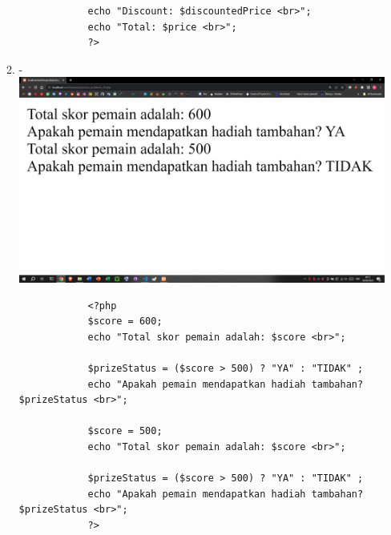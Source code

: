 \documentclass[12pt,titlepage]{article}
\begin{document}
\begin{enumerate}[label*=\arabic*.]
\begin{enumerate}[label*=\arabic*.]
\begin{verbatim}
            echo "Discount: $discountedPrice <br>";
            echo "Total: $price <br>";
            ?>
        \end{verbatim}
        \item - \\ \includegraphics[width=.8\textwidth]{images/figures/fig15.png}
        \begin{verbatim}
            <?php
            $score = 600;
            echo "Total skor pemain adalah: $score <br>";
            
            $prizeStatus = ($score > 500) ? "YA" : "TIDAK" ;
            echo "Apakah pemain mendapatkan hadiah tambahan? $prizeStatus <br>";
            
            $score = 500;
            echo "Total skor pemain adalah: $score <br>";
            
            $prizeStatus = ($score > 500) ? "YA" : "TIDAK" ;
            echo "Apakah pemain mendapatkan hadiah tambahan? $prizeStatus <br>";
            ?>
        \end{verbatim}
    \end{enumerate}
    \newpage

\end{enumerate}
\end{document}
